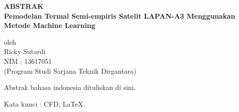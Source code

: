 \newpage

\begin{center}
       \Large
       \textbf{ABSTRAK} \\
        \vspace{1.5cm}
        \large
        \textbf{Pemodelan Termal Semi-empiris Satelit LAPAN-A3 Menggunakan Metode Machine Learning}\\
        
        \vspace{1.5cm}
        
        oleh\\
        Ricky Sutardi\\
        NIM : 13617051\\
        (Program Studi Sarjana Teknik Dirgantara)\\
        \vspace{1.5cm}
\end{center}

Abstrak bahasa indonesia dituliskan di sini.

\vspace{1.0cm}
\noindent 
Kata kunci : CFD, \LaTeX.
